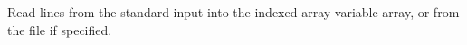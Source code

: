 \label{par:readarray}

Read lines from the standard input into the indexed array variable array, or from the file  if specified.

